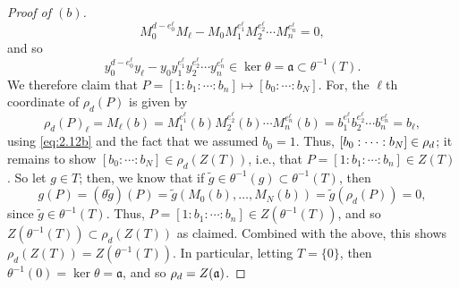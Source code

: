 \documentclass[12pt,letterpaper]{article}
\theoremstyle{definition}
\theoremstyle{remark}
\numberwithin{equation}{section}
\numberwithin{figure}{problem}
\let\Im\relax
\DeclareMathOperator{\Im}{im}
\newcommand{\PP}{\mathbb{P}}
\begin{document}
\begin{proof}[Proof of $(b)$]
\begin{equation*}
    M_0^{d-e^\ell_0}M_\ell - M_0M_1^{e^\ell_1}M_2^{e^\ell_2}\cdots
    M_n^{e^\ell_n} = 0,
  \end{equation*}
  and so
  \begin{equation}\label{eq:2.12b}
    y_0^{d-e^\ell_0}y_\ell - y_0y_1^{e^\ell_1}y_2^{e^\ell_2}\cdots
    y_n^{e^\ell_n} \in \ker\theta = \mathfrak{a} \subset \theta^{-1}(T).
  \end{equation}
  We therefore claim that $P = [1 : b_1 : \cdots : b_n] \mapsto [b_0:\cdots:b_N]$.
  For, the $\ell$th coordinate of $\rho_d(P)$ is given by
  \begin{equation*}
    \rho_d(P)_\ell = M_\ell(b) = M_1^{e^\ell_1}(b)M_2^{e^\ell_2}(b) \cdots
    M_n^{e^\ell_n}(b) = b_1^{e^\ell_1}b_2^{e^\ell_2} \cdots b_n^{e^\ell_n} =
    b_\ell,
  \end{equation*}
  using \eqref{eq:2.12b} and the fact that we assumed $b_0 = 1$. Thus, $[b_0 :
  \cdots : b_N] \in \Im\rho_d$; it remains to show $[b_0 : \cdots : b_N] \in
  \rho_d(Z(T))$, i.e., that $P = [1 : b_1 : \cdots : b_n] \in Z(T)$. So let
  $g \in T$; then, we know that if $\tilde{g} \in \theta^{-1}(g) \subset
  \theta^{-1}(T)$, then
  \begin{equation*}
    g(P) = (\theta\tilde{g})(P) = \tilde{g}(M_0(b),\ldots,M_N(b)) =
    \tilde{g}(\rho_d(P)) = 0,
  \end{equation*}
  since $\tilde{g} \in \theta^{-1}(T)$. Thus, $P = [1 : b_1 : \cdots : b_n] \in
  Z(\theta^{-1}(T))$, and so $Z(\theta^{-1}(T)) \subset \rho_d(Z(T))$ as
  claimed. Combined with the above, this shows $\rho_d(Z(T)) =
  Z(\theta^{-1}(T))$. In particular, letting $T = \{0\}$, then $\theta^{-1}(0) =
  \ker\theta = \mathfrak{a}$, and so $\Im \rho_d = Z(\mathfrak{a})$.

\end{proof}
\end{document}
